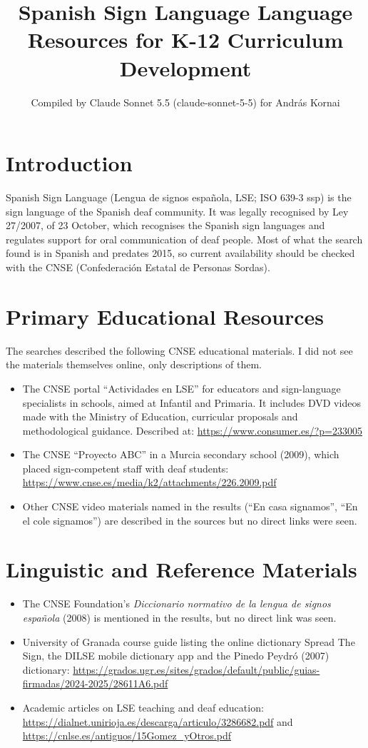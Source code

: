 \documentclass[12pt]{article}
\title{Spanish Sign Language Language Resources for K-12 Curriculum Development}
\author{Compiled by Claude Sonnet 5.5 (claude-sonnet-5-5) for Andr\'as Kornai}
\date{}
\begin{document}
\maketitle

\section{Introduction}
Spanish Sign Language (Lengua de signos espa\~nola, LSE; ISO 639-3 ssp) is the sign language of the Spanish deaf community. It was legally recognised by Ley 27/2007, of 23 October, which recognises the Spanish sign languages and regulates support for oral communication of deaf people. Most of what the search found is in Spanish and predates 2015, so current availability should be checked with the CNSE (Confederaci\'on Estatal de Personas Sordas).

\section{Primary Educational Resources}
The searches described the following CNSE educational materials. I did not see the materials themselves online, only descriptions of them.
\begin{itemize}
\item The CNSE portal ``Actividades en LSE'' for educators and sign-language specialists in schools, aimed at Infantil and Primaria. It includes DVD videos made with the Ministry of Education, curricular proposals and methodological guidance. Described at: \url{https://www.consumer.es/?p=233005}
\item The CNSE ``Proyecto ABC'' in a Murcia secondary school (2009), which placed sign-competent staff with deaf students: \url{https://www.cnse.es/media/k2/attachments/226.2009.pdf}
\item Other CNSE video materials named in the results (``En casa signamos'', ``En el cole signamos'') are described in the sources but no direct links were seen.
\end{itemize}

\section{Linguistic and Reference Materials}
\begin{itemize}
\item The CNSE Foundation's \emph{Diccionario normativo de la lengua de signos espa\~nola} (2008) is mentioned in the results, but no direct link was seen.
\item University of Granada course guide listing the online dictionary Spread The Sign, the DILSE mobile dictionary app and the Pinedo Peydr\'o (2007) dictionary: \url{https://grados.ugr.es/sites/grados/default/public/guias-firmadas/2024-2025/28611A6.pdf}
\item Academic articles on LSE teaching and deaf education: \url{https://dialnet.unirioja.es/descarga/articulo/3286682.pdf} and \url{https://cnlse.es/antiguos/15Gomez_yOtros.pdf}
\end{itemize}
\end{document}
